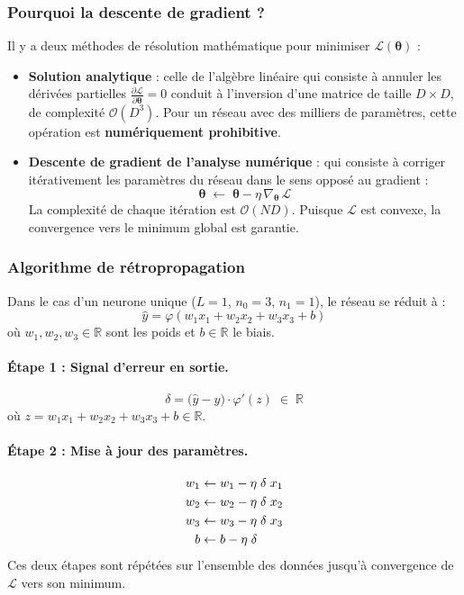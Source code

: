 \subsubsection*{Pourquoi la descente de gradient ?}

Il y a deux méthodes de résolution mathématique pour minimiser 
$\mathcal{L}(\boldsymbol{\theta})$ :

\begin{itemize}[label=$\bullet$]
	
	\item \textbf{Solution analytique} : celle de l'algèbre linéaire qui consiste à annuler les dérivées partielles
	$\frac{\partial \mathcal{L}}{\partial \boldsymbol{\theta}} = 0$
	conduit à l'inversion d'une matrice de taille $D \times D$,
	de complexité $\mathcal{O}(D^3)$. Pour un réseau avec des
	milliers de paramètres, cette opération est
	\textbf{numériquement prohibitive}.
	
	\item \textbf{Descente de gradient de l'analyse numérique} : qui consiste à corriger itérativement les
	paramètres du réseau dans le sens opposé au gradient :
	\[
	\boldsymbol{\theta} \;\leftarrow\;
	\boldsymbol{\theta} - \eta\,
	\nabla_{\boldsymbol{\theta}}\,\mathcal{L}
	\]
	La complexité de chaque itération est $\mathcal{O}(ND)$. Puisque $\mathcal{L}$ 
	est convexe, la convergence vers le minimum global est garantie.
	
\end{itemize}

\subsubsection*{Algorithme de rétropropagation}

Dans le cas d'un neurone unique ($L=1$, $n_0=3$, $n_1=1$),
le réseau se réduit à :
\[
\hat{y} = \varphi\!\left(w_1 x_1 + w_2 x_2 + w_3 x_3 + b\right)
\]
où $w_1, w_2, w_3 \in \mathbb{R}$ sont les poids et $b \in \mathbb{R}$ le biais.

\paragraph{Étape 1 : Signal d'erreur en sortie.}
\begin{equation}
	\delta = \bigl(\hat{y} - y\bigr)\cdot\varphi'(z) \;\in\; \mathbb{R}
\end{equation}
où $z = w_1 x_1 + w_2 x_2 + w_3 x_3 + b \in \mathbb{R}$.

\paragraph{Étape 2 : Mise à jour des paramètres.}
\begin{align}
	w_1 &\leftarrow w_1 - \eta\;\delta\; x_1 \notag\\
	w_2 &\leftarrow w_2 - \eta\;\delta\; x_2 \notag\\
	w_3 &\leftarrow w_3 - \eta\;\delta\; x_3 \notag\\
	b   &\leftarrow b   - \eta\;\delta          \notag
\end{align}
Ces deux étapes sont répétées sur l'ensemble des données jusqu'à
convergence de $\mathcal{L}$ vers son minimum.

